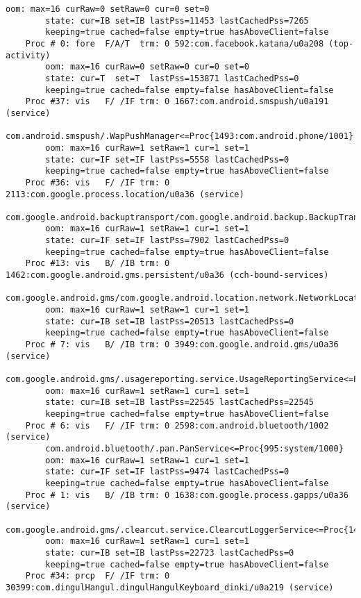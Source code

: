 \begin{lstlisting}[frame=single]
        oom: max=16 curRaw=0 setRaw=0 cur=0 set=0
        state: cur=IB set=IB lastPss=11453 lastCachedPss=7265
        keeping=true cached=false empty=true hasAboveClient=false
    Proc # 0: fore  F/A/T  trm: 0 592:com.facebook.katana/u0a208 (top-activity)
        oom: max=16 curRaw=0 setRaw=0 cur=0 set=0
        state: cur=T  set=T  lastPss=153871 lastCachedPss=0
        keeping=true cached=false empty=false hasAboveClient=false
    Proc #37: vis   F/ /IF trm: 0 1667:com.android.smspush/u0a191 (service)
        com.android.smspush/.WapPushManager<=Proc{1493:com.android.phone/1001}
        oom: max=16 curRaw=1 setRaw=1 cur=1 set=1
        state: cur=IF set=IF lastPss=5558 lastCachedPss=0
        keeping=true cached=false empty=true hasAboveClient=false
    Proc #36: vis   F/ /IF trm: 0 2113:com.google.process.location/u0a36 (service)
        com.google.android.backuptransport/com.google.android.backup.BackupTransportService<=Proc{995:system/1000}
        oom: max=16 curRaw=1 setRaw=1 cur=1 set=1
        state: cur=IF set=IF lastPss=7902 lastCachedPss=0
        keeping=true cached=false empty=true hasAboveClient=false
    Proc #13: vis   B/ /IB trm: 0 1462:com.google.android.gms.persistent/u0a36 (cch-bound-services)
        com.google.android.gms/com.google.android.location.network.NetworkLocationService<=Proc{995:system/1000}
        oom: max=16 curRaw=1 setRaw=1 cur=1 set=1
        state: cur=IB set=IB lastPss=20513 lastCachedPss=0
        keeping=true cached=false empty=true hasAboveClient=false
    Proc # 7: vis   B/ /IB trm: 0 3949:com.google.android.gms/u0a36 (service)
        com.google.android.gms/.usagereporting.service.UsageReportingService<=Proc{1638:com.google.process.gapps/u0a36}
        oom: max=16 curRaw=1 setRaw=1 cur=1 set=1
        state: cur=IB set=IB lastPss=22545 lastCachedPss=22545
        keeping=true cached=false empty=true hasAboveClient=false
    Proc # 6: vis   F/ /IF trm: 0 2598:com.android.bluetooth/1002 (service)
        com.android.bluetooth/.pan.PanService<=Proc{995:system/1000}
        oom: max=16 curRaw=1 setRaw=1 cur=1 set=1
        state: cur=IF set=IF lastPss=9474 lastCachedPss=0
        keeping=true cached=false empty=true hasAboveClient=false
    Proc # 1: vis   B/ /IB trm: 0 1638:com.google.process.gapps/u0a36 (service)
        com.google.android.gms/.clearcut.service.ClearcutLoggerService<=Proc{1462:com.google.android.gms.persistent/u0a36}
        oom: max=16 curRaw=1 setRaw=1 cur=1 set=1
        state: cur=IB set=IB lastPss=22723 lastCachedPss=0
        keeping=true cached=false empty=true hasAboveClient=false
    Proc #34: prcp  F/ /IF trm: 0 30399:com.dingulHangul.dingulHangulKeyboard_dinki/u0a219 (service)

\end{lstlisting}
